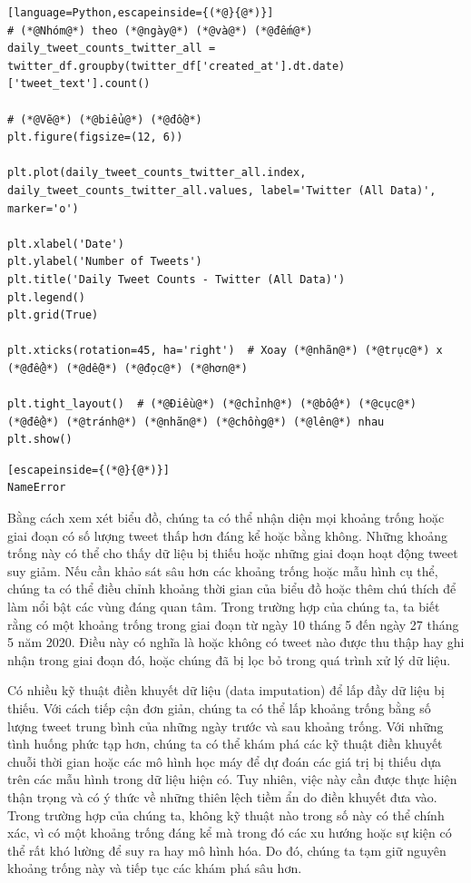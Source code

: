 \begin{lstlisting}[language=Python,escapeinside={(*@}{@*)}]
# (*@Nhóm@*) theo (*@ngày@*) (*@và@*) (*@đếm@*)
daily_tweet_counts_twitter_all = twitter_df.groupby(twitter_df['created_at'].dt.date)['tweet_text'].count()

# (*@Vẽ@*) (*@biểu@*) (*@đồ@*)
plt.figure(figsize=(12, 6))

plt.plot(daily_tweet_counts_twitter_all.index, daily_tweet_counts_twitter_all.values, label='Twitter (All Data)', marker='o')

plt.xlabel('Date')
plt.ylabel('Number of Tweets')
plt.title('Daily Tweet Counts - Twitter (All Data)')
plt.legend()
plt.grid(True)

plt.xticks(rotation=45, ha='right')  # Xoay (*@nhãn@*) (*@trục@*) x (*@để@*) (*@dễ@*) (*@đọc@*) (*@hơn@*)

plt.tight_layout()  # (*@Điều@*) (*@chỉnh@*) (*@bố@*) (*@cục@*) (*@để@*) (*@tránh@*) (*@nhãn@*) (*@chồng@*) (*@lên@*) nhau
plt.show()
\end{lstlisting}

\begin{lstlisting}[escapeinside={(*@}{@*)}]
NameError
\end{lstlisting}

Bằng cách xem xét biểu đồ, chúng ta có thể nhận diện mọi khoảng trống hoặc giai đoạn có số lượng tweet thấp hơn đáng kể hoặc bằng không. Những khoảng trống này có thể cho thấy dữ liệu bị thiếu hoặc những giai đoạn hoạt động tweet suy giảm. Nếu cần khảo sát sâu hơn các khoảng trống hoặc mẫu hình cụ thể, chúng ta có thể điều chỉnh khoảng thời gian của biểu đồ hoặc thêm chú thích để làm nổi bật các vùng đáng quan tâm. Trong trường hợp của chúng ta, ta biết rằng có một khoảng trống trong giai đoạn từ ngày 10 tháng 5 đến ngày 27 tháng 5 năm 2020. Điều này có nghĩa là hoặc không có tweet nào được thu thập hay ghi nhận trong giai đoạn đó, hoặc chúng đã bị lọc bỏ trong quá trình xử lý dữ liệu.

Có nhiều kỹ thuật điền khuyết dữ liệu (data imputation) để lấp đầy dữ liệu bị thiếu. Với cách tiếp cận đơn giản, chúng ta có thể lấp khoảng trống bằng số lượng tweet trung bình của những ngày trước và sau khoảng trống. Với những tình huống phức tạp hơn, chúng ta có thể khám phá các kỹ thuật điền khuyết chuỗi thời gian hoặc các mô hình học máy để dự đoán các giá trị bị thiếu dựa trên các mẫu hình trong dữ liệu hiện có. Tuy nhiên, việc này cần được thực hiện thận trọng và có ý thức về những thiên lệch tiềm ẩn do điền khuyết đưa vào. Trong trường hợp của chúng ta, không kỹ thuật nào trong số này có thể chính xác, vì có một khoảng trống đáng kể mà trong đó các xu hướng hoặc sự kiện có thể rất khó lường để suy ra hay mô hình hóa. Do đó, chúng ta tạm giữ nguyên khoảng trống này và tiếp tục các khám phá sâu hơn.


